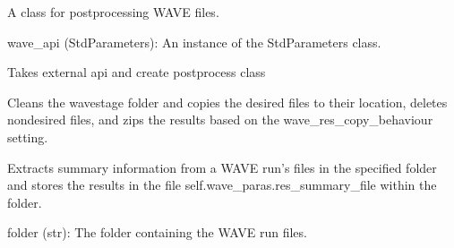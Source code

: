 \documentclass[letterpaper,10pt,english]{sphinxmanual}
\begin{document}
\begin{fulllineitems}
\label{\detokenize{autoapi/unduwave/index:unduwave.wave_postprocess}}
\pysigstartsignatures
{}
\pysigstopsignatures
\sphinxAtStartPar
A class for postprocessing WAVE files.
\begin{description}
\sphinxAtStartPar
wave\_api (StdParameters): An instance of the StdParameters class.

\end{description}

\sphinxAtStartPar
Takes external api and create postprocess class

\begin{fulllineitems}
\label{\detokenize{autoapi/unduwave/index:unduwave.wave_postprocess.copy_results}}
\pysigstartsignatures
{}
\pysigstopsignatures
\sphinxAtStartPar
Cleans the wave\sphinxhyphen{}stage folder and copies the desired files to their location,
deletes non\sphinxhyphen{}desired files, and zips the results based on the wave\_res\_copy\_behaviour setting.

\end{fulllineitems}


\begin{fulllineitems}
\label{\detokenize{autoapi/unduwave/index:unduwave.wave_postprocess.extract_summary}}
\pysigstartsignatures
{}
\pysigstopsignatures
\sphinxAtStartPar
Extracts summary information from a WAVE run’s files in the specified folder
and stores the results in the file self.wave\_paras.res\_summary\_file within the folder.
\begin{description}
\sphinxAtStartPar
folder (str): The folder containing the WAVE run files.

\end{description}


\end{fulllineitems}
\end{fulllineitems}
\end{document}
